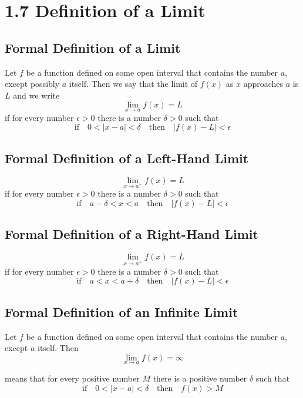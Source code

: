%
%

\section*{1.7 Definition of a Limit}

\subsection*{Formal Definition of a Limit}

Let \(f\) be a function defined on some open interval that contains the number \(a\), except possibly \(a\) itself. Then we say that the limit of \(f(x)\) as \(x\) approaches \(a\) is \(L\) and we write
$$\lim_{x \to a}f(x)=L$$
if for every number \(\epsilon > 0\) there is a number \(\delta > 0\) such that
$$\text{if} \quad 0< \left| x-a \right| <\delta \quad \text{then} \quad \left| f(x)-L \right| <\epsilon$$

\subsection*{Formal Definition of a Left-Hand Limit}

$$\lim_{x \to a^-}f(x)=L$$
if for every number \(\epsilon > 0\) there is a number \(\delta > 0\) such that 
$$\text{if} \quad a-\delta<x<a \quad \text{then} \quad \left| f(x)-L \right| <\epsilon$$ 

\subsection*{Formal Definition of a Right-Hand Limit}

$$\lim_{x \to a^+}f(x)=L$$
if for every number \(\epsilon > 0\) there is a number \(\delta > 0\) such that 
$$\text{if} \quad a<x<a+\delta \quad \text{then} \quad \left| f(x)-L \right| <\epsilon$$ 

\subsection*{Formal Definition of an Infinite Limit}

Let \(f\) be a function defined on some open interval that contains the number \(a\), except \(a\) itself. Then
$$\lim_{x \to a}f(x)=\infty$$

means that for every positive number \(M\) there is a positive number \(\delta\) such that 
$$\text{if} \quad 0< \left| x-a \right| <\delta \quad \text{then} \quad f(x)>M$$


